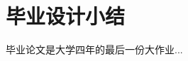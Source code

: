 \renewcommand{\baselinestretch}{1.5}
\fontsize{12pt}{13pt}\selectfont
{}
\chapter*{毕业设计小结}

毕业论文是大学四年的最后一份大作业...

\clearpage